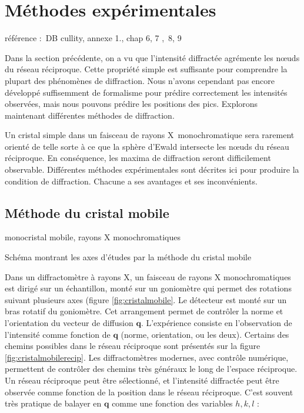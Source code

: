 \chapter{Méthodes expérimentales}

référence : DB cullity, annexe 1., chap 6, 7 , 8, 9

Dans la section précédente, on a vu que l'intensité diffractée agrémente les nœuds du réseau réciproque. Cette propriété simple est suffisante pour comprendre la plupart des phénomènes de diffraction.
Nous n'avons cependant pas encore développé suffisemment de formalisme pour prédire correctement les intensités observées, mais nous pouvons prédire les positions des pics. Explorons maintenant différentes méthodes de diffraction.

Un cristal simple dans un faisceau de rayons X monochromatique sera rarement orienté de telle sorte à ce que la sphère d'Ewald intersecte les nœuds du réseau réciproque. En conséquence, les maxima de diffraction seront difficilement observable. Différentes méthodes expérimentales sont décrites ici pour produire la condition de diffraction. Chacune a ses avantages et ses inconvénients.

\section{Méthode du cristal mobile}
monocristal mobile, rayons X monochromatiques

\begin{marginfigure}
    \TODO
    \caption{Schéma montrant les axes d'études par la méthode du cristal mobile}
    \label{fig:cristalmobile}
\end{marginfigure}

Dans un diffractomètre à rayons X, un faisceau de rayons X monochromatiques est dirigé sur un échantillon, monté sur un goniomètre qui permet des rotations suivant plusieurs axes (figure \ref{fig:cristalmobile}. Le détecteur est monté sur un bras rotatif du goniomètre. Cet arrangement permet de contrôler la norme et l'orientation du vecteur de diffusion $\mathbf{q}$. L'expérience consiste en l'observation de l'intensité comme fonction de $\mathbf{q}$ (norme, orientation, ou les deux). Certains des chemins possibles dans le réseau réciproque sont présentés sur la figure \ref{fig:cristalmobilerecip}. Les diffractomètres modernes, avec contrôle numérique, permettent de contrôler des chemins très généraux le long de l'espace réciproque.
Un réseau réciproque peut être sélectionné, et l'intensité diffractée peut être observée comme fonction de la position dans le réseau réciproque. C'est souvent très pratique de balayer en $\mathbf{q}$ comme une fonction des variables $h,k,l$ :

